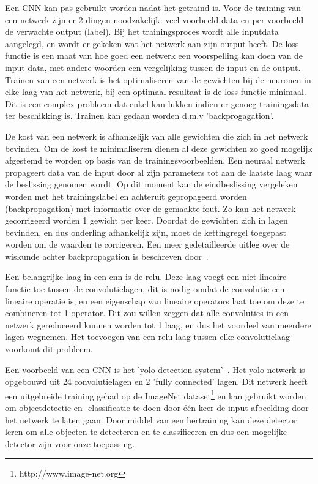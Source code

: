             Een CNN kan pas gebruikt worden nadat het getraind is. Voor de training van een netwerk zijn er 2 dingen noodzakelijk: veel voorbeeld data en per voorbeeld de verwachte output (label).
            Bij het trainingsproces wordt alle inputdata aangelegd, en wordt er gekeken wat het netwerk aan zijn output heeft.
            De loss functie is een maat van hoe goed een netwerk een voorspelling kan doen van de input data, met andere woorden een vergelijking tussen de input en de output.
            Trainen van een netwerk is het optimaliseren van de gewichten bij de neuronen in elke laag van het netwerk, bij een optimaal resultaat is de loss functie minimaal.
            Dit is een complex probleem dat enkel kan lukken indien er genoeg trainingsdata ter beschikking is.
            Trainen kan gedaan worden d.m.v 'backprogagation'.

            De kost van een netwerk is afhankelijk van alle gewichten die zich in het netwerk bevinden.
            Om de kost te minimaliseren dienen al deze gewichten zo goed mogelijk afgestemd te worden op basis van de trainingsvoorbeelden.
            Een neuraal netwerk propageert data van de input door al zijn parameters tot aan de laatste laag waar de beslissing genomen wordt.
            Op dit moment kan de eindbeslissing vergeleken worden met het trainingslabel en achteruit gepropageerd worden (backpropagation) met informatie over de gemaakte fout.
            Zo kan het netwerk gecorrigeerd worden 1 gewicht per keer.
            Doordat de gewichten zich in lagen bevinden, en dus onderling afhankelijk zijn, moet de kettingregel toegepast worden om de waarden te corrigeren.
            Een meer gedetailleerde uitleg over de wiskunde achter backpropagation is beschreven door~\cite{nielsenneural}.

            Een belangrijke laag in een \gls{cnn} is de \gls{relu}.
            Deze laag voegt een niet lineaire functie toe tussen de convolutielagen, dit is nodig omdat de convolutie een lineaire operatie is, en een eigenschap van lineaire operators laat toe om deze te combineren tot 1 operator.
            Dit zou willen zeggen dat alle convoluties in een netwerk gereduceerd kunnen worden tot 1 laag, en dus het voordeel van meerdere lagen wegnemen.
            Het toevoegen van een \gls{relu} laag tussen elke convolutielaag voorkomt dit probleem.

            Een voorbeeld van een CNN is het '\gls{yolo} detection system'~\cite{Redmon_2016}. Het \gls{yolo} netwerk is opgebouwd uit 24 convolutielagen en 2 'fully connected' lagen.
            Dit netwerk heeft een uitgebreide training gehad op de ImageNet dataset\footnote{http://www.image-net.org} en kan gebruikt worden om objectdetectie en -classificatie te doen door \'{e}\'{e}n keer de input afbeelding door het netwerk te laten gaan.
            Door middel van een hertraining kan deze detector leren om alle objecten te detecteren en te classificeren en dus een mogelijke detector zijn voor onze toepassing.

